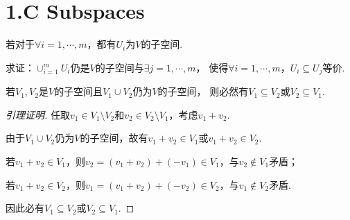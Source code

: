 \section{1.C Subspaces}

\begin{problem}[13]\label{1.C.10}
    若对于\(\forall i=1,\cdots,m\)，都有\(U_i\)为\(V\)的子空间.

    求证：\(\cup_{i=1}^m U_i\)仍是\(V\)的子空间与\(\exists j=1,\cdots,m\)，
    使得\(\forall i=1,\cdots,m\)，\(U_i \subseteq U_j\)等价.
\end{problem}

\begin{lemma}\label{lem 1.C.10}
    若\(V_1,V_2\)是\(V\)的子空间且\(V_1 \cup V_2\)仍为\(V\)的子空间，
    则必然有\(V_1 \subseteq V_2\)或\(V_2 \subseteq V_1\).
\end{lemma}

\begin{proof}[引理证明]
    任取\(v_1 \in V_1 \setminus V_2\)和\(v_2 \in V_2 \setminus V_1\)，考虑\(v_1+v_2\).

    由于\(V_1 \cup V_2\)仍为\(V\)的子空间，故有\(v_1+v_2 \in V_1\)或\(v_1+v_2 \in V_2\).

    若\(v_1+v_2 \in V_1\)，则\(v_2=(v_1+v_2)+(-v_1) \in V_1\)，与\(v_2 \notin V_1\)矛盾；

    若\(v_1+v_2 \in V_2\)，则\(v_1=(v_1+v_2)+(-v_2) \in V_2\)，与\(v_1 \notin V_2\)矛盾.

    因此必有\(V_1 \subseteq V_2\)或\(V_2 \subseteq V_1\).
\end{proof}

